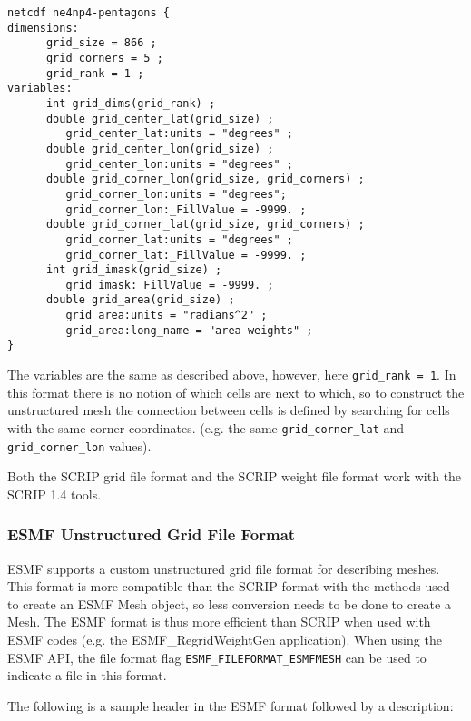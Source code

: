\begin{verbatim}
netcdf ne4np4-pentagons {
dimensions:
      grid_size = 866 ;
      grid_corners = 5 ;
      grid_rank = 1 ;
variables:
      int grid_dims(grid_rank) ;
      double grid_center_lat(grid_size) ;
         grid_center_lat:units = "degrees" ;
      double grid_center_lon(grid_size) ;
         grid_center_lon:units = "degrees" ;
      double grid_corner_lon(grid_size, grid_corners) ;
         grid_corner_lon:units = "degrees";
         grid_corner_lon:_FillValue = -9999. ;
      double grid_corner_lat(grid_size, grid_corners) ;
         grid_corner_lat:units = "degrees" ;
         grid_corner_lat:_FillValue = -9999. ;
      int grid_imask(grid_size) ;
         grid_imask:_FillValue = -9999. ;
      double grid_area(grid_size) ;
         grid_area:units = "radians^2" ;
         grid_area:long_name = "area weights" ;
}
\end{verbatim}

The variables are the same as described above, however, here {\tt grid\_rank = 1}. In this format there
is no notion of which cells are next to which, so to construct the unstructured mesh the connection between
cells is defined by searching for cells with the same corner coordinates. (e.g. the same {\tt grid\_corner\_lat}
and {\tt grid\_corner\_lon} values).

Both the SCRIP grid file format and the SCRIP weight file format work with the SCRIP 1.4 tools.

\subsubsection{ESMF Unstructured Grid File Format}\label{sec:fileformat:esmf}

ESMF supports a custom unstructured grid file format for describing meshes. This format is more compatible than the SCRIP format with the methods used to create an ESMF Mesh object, so less conversion needs to be done to create a Mesh. The ESMF format is thus more efficient than SCRIP when used with ESMF codes (e.g. the ESMF\_RegridWeightGen application). When using the ESMF API, the file format flag {\tt ESMF\_FILEFORMAT\_ESMFMESH} can be used to indicate a file in this format.

The following is a sample header in the ESMF format followed by a description:

